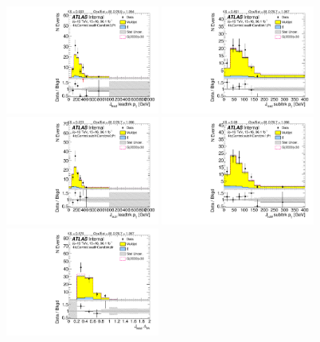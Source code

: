 \begin{figure}[htbp!]
\begin{center}
\includegraphics[angle=270, width=0.45\textwidth]{./figures/boosted/Control/b77_FourTag_Control_leadHCand_trk0_Pt.pdf}
\includegraphics[angle=270, width=0.45\textwidth]{./figures/boosted/Control/b77_FourTag_Control_leadHCand_trk1_Pt.pdf}\\
\includegraphics[angle=270, width=0.45\textwidth]{./figures/boosted/Control/b77_FourTag_Control_sublHCand_trk0_Pt.pdf}
\includegraphics[angle=270, width=0.45\textwidth]{./figures/boosted/Control/b77_FourTag_Control_sublHCand_trk1_Pt.pdf}\\
\includegraphics[angle=270, width=0.45\textwidth]{./figures/boosted/Control/b77_FourTag_Control_leadHCand_trk_dr.pdf}

\end{center}
\end{figure}
